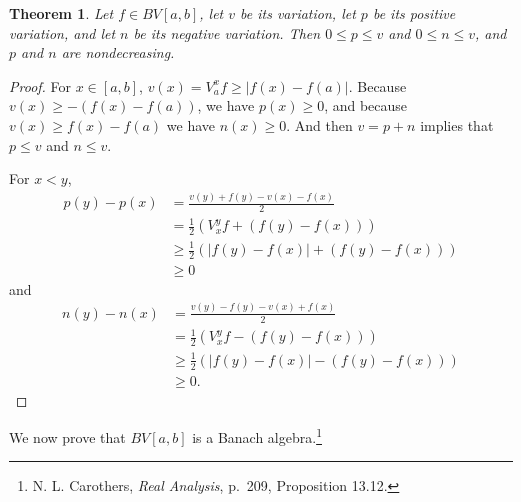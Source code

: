 \documentclass{article}
\newtheorem{theorem}{Theorem}
\theoremstyle{definition}
\begin{document}
\begin{theorem}
Let $f \in BV[a,b]$, let $v$ be its variation, let $p$ be its positive variation, and let $n$ be its negative variation.
Then $0 \leq p \leq v$ and $0 \leq n \leq v$, and
$p$ and $n$ are nondecreasing.
\end{theorem}
\begin{proof}
For $x \in [a,b]$, $v(x)=V_a^x f \geq |f(x)-f(a)|$. Because $v(x) \geq -(f(x)-f(a))$, we have
$p(x) \geq 0$, and because $v(x) \geq f(x)-f(a)$ we have $n(x) \geq 0$. And then $v=p+n$ implies that
$p \leq v$ and $n \leq v$.

For $x<y$,
\begin{align*}
p(y)-p(x)&=\frac{v(y)+f(y)-v(x)-f(x)}{2}\\
&=\frac{1}{2}\left(V_x^y f + (f(y)-f(x)) \right)\\
&\geq \frac{1}{2}\left( |f(y)-f(x)| + (f(y)-f(x))\right)\\
&\geq 0
\end{align*}
and
\begin{align*}
n(y)-n(x)&=\frac{v(y)-f(y)-v(x)+f(x)}{2}\\
&=\frac{1}{2}\left( V_x^y f - (f(y)-f(x)) \right)\\
&\geq \frac{1}{2}\left( |f(y)-f(x)| - (f(y)-f(x)) \right)\\
&\geq 0.
\end{align*}
\end{proof}



We now prove that $BV[a,b]$ is a Banach algebra.\footnote{N. L. Carothers, {\em Real Analysis}, p.~209, Proposition 13.12.}
\end{document}
